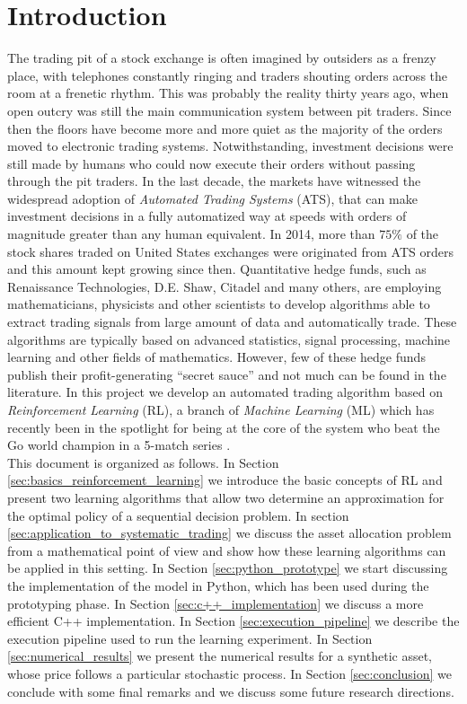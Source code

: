 \section{Introduction}
\label{sec:introduction}

The trading pit of a stock exchange is often imagined by outsiders as a frenzy place, with telephones constantly ringing and traders shouting orders across the room at a frenetic rhythm. This was probably the reality thirty years ago, when open outcry was still the main communication system between pit traders. Since then the floors have become more and more quiet as the majority of the orders moved to electronic trading systems. Notwithstanding, investment decisions were still made by humans who could now execute their orders without passing through the pit traders. In the last decade, the markets have witnessed the widespread adoption of \emph{Automated Trading Systems} (ATS), that can make investment decisions in a fully automatized way at speeds with orders of magnitude greater than any human equivalent. In 2014, more than $75\%$ of the stock shares traded on United States exchanges were originated from ATS orders and this amount kept growing since then. Quantitative hedge funds, such as Renaissance Technologies, D.E. Shaw, Citadel and many others, are employing mathematicians, physicists and other scientists to develop algorithms able to extract trading signals from large amount of data and automatically trade. These algorithms are typically based on advanced statistics, signal processing, machine learning and other fields of mathematics. However, few of these hedge funds publish their profit-generating ``secret sauce'' and not much can be found in the literature. In this project we develop an automated trading algorithm based on \emph{Reinforcement Learning} (RL), a branch of \emph{Machine Learning} (ML) which has recently been in the spotlight for being at the core of the system who beat the Go world champion in a 5-match series \cite{silver2016mastering}.\\
This document is organized as follows. In Section \ref{sec:basics_reinforcement_learning} we introduce the basic concepts of RL and present two learning algorithms that allow two determine an approximation for the optimal policy of a sequential decision problem. In section \ref{sec:application_to_systematic_trading} we discuss the asset allocation problem from a mathematical point of view and show how these learning algorithms can be applied in this setting. In Section \ref{sec:python_prototype} we start discussing the implementation of the model in Python, which has been used during the prototyping phase. In Section \ref{sec:c++_implementation} we discuss a more efficient C++ implementation. In Section \ref{sec:execution_pipeline} we describe the execution pipeline used to run the learning experiment. In Section \ref{sec:numerical_results} we present the numerical results for a synthetic asset, whose price follows a particular stochastic process. In Section \ref{sec:conclusion} we conclude with some final remarks and we discuss some future research directions. 
